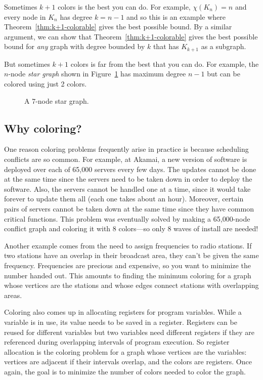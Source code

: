 Sometimes $k+1$ colors is the best you can do.  For example, $\chi(K_n) = n$
and every node in $K_n$ has degree $k = n - 1$ and so this is an example where
Theorem~\ref{thm:k+1-colorable} gives the best possible bound.  By a
similar argument, we can show that Theorem~\ref{thm:k+1-colorable} gives
the best possible bound for \emph{any} graph with degree bounded by
$k$ that has $K_{k+1}$ as a subgraph.

But sometimes $k+1$ colors is far from the best that you can do.
For example, the $n$-node \emph{star graph} shown in
Figure~\ref{fig:5T} has maximum degree $n - 1$ but can be colored
using just 2 colors.

\begin{figure}


\caption{A 7-node star graph.}

\label{fig:5T}

\end{figure}


\subsection{Why coloring?}

One reason coloring problems frequently arise in practice is because
scheduling conflicts are so common.  For example, at Akamai, a new
version of software is deployed over each of 65,000 servers every few
days.  The updates cannot be done at the same time since the servers
need to be taken down in order to deploy the software.  Also, the
servers cannot be handled one at a time, since it would take forever
to update them all (each one takes about an hour).  Moreover, certain
pairs of servers cannot be taken down at the same time since they have
common critical functions.  This problem was eventually solved by
making a 65,000-node conflict graph and coloring it with 8 colors---so
only 8 waves of install are needed!

Another example comes from the need to assign frequencies to radio
stations.  If two stations have an overlap in their broadcast area, they
can't be given the same frequency.  Frequencies are precious and
expensive, so you want to minimize the number handed out.  This amounts to
finding the minimum coloring for a graph whose vertices are the stations
and whose edges connect stations with overlapping areas.

Coloring also comes up in allocating registers for program variables.
While a variable is in use, its value needs to be saved in a register.
Registers can be reused for different variables but two variables need
different registers if they are referenced during overlapping
intervals of program execution.  So register allocation is the
coloring problem for a graph whose vertices are the variables:
vertices are adjacent if their intervals overlap, and the colors are
registers.  Once again, the goal is to minimize the number of colors
needed to color the graph.

